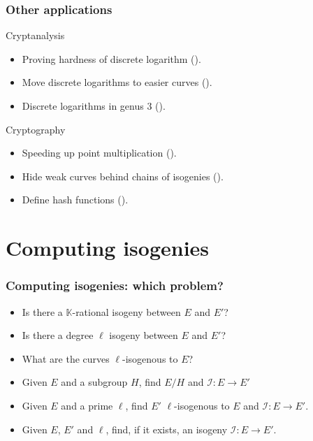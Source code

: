 \documentclass[10pt]{beamer}
\newcommand{\blue}[1]{\textcolor{blue}{#1}}  %
\newcommand{\K}{\mathbb{K}}  %
\newcommand{\0}{\mathcal{O}}  %
\newcommand{\isog}[1]{\mathcal{#1}}  %
\newcommand{\I}{\isog{I}}  %
\begin{document}
\begin{frame}
  \frametitle{Other applications}
  
  \begin{block}{Cryptanalysis}
    \begin{itemize}
    \item Proving hardness of discrete logarithm (\cite{JMV05}).
    \item Move discrete logarithms to easier curves (\cite{GHS}).
    \item Discrete logarithms in genus $3$ (\cite{Ben}).
    \end{itemize}
  \end{block}
  
  \begin{block}{Cryptography}
    \begin{itemize}
    \item Speeding up point multiplication (\cite{GLV}).
    \item Hide weak curves behind chains of isogenies (\cite{Tes06}).
    \item Define hash functions (\cite{CLG09}).
    \end{itemize}
  \end{block}
\end{frame}


\section{Computing isogenies}

\begin{frame}
  \frametitle{Computing isogenies: which problem?}
  
  \begin{itemize}
  \setlength{\itemsep}{1em}
  \item Is there a $\K$-rational isogeny between $E$ and $E'$?
    \hfill\only<2->{\blue{$\Leftrightarrow \#E(\K) = \#E'(\K)$}}
  \item Is there a degree $\ell$ isogeny between $E$ and $E'$?
    \hfill\only<2->{\blue{$\Leftrightarrow \Phi_\ell(j(E), j(E')) = 0$}}
  \item What are the curves $\ell$-isogenous to $E$?
    \hfill\only<2->{\blue{factor $\Phi_\ell(j(E), Y)$}}
  \item Given $E$ and a subgroup $H$, find $E/H$ and $\I:E\rightarrow
    E'$ \hfill\only<2->{\blue{Vélu formulae}}
  \item Given $E$ and a prime $\ell$, find $E'$ $\ell$-isogenous to
    $E$ and $\I:E\rightarrow E'$.\hfill\only<3->{\blue{(*)}}
  \item \alert<3>{Given $E$, $E'$ and $\ell$, find, if it exists, an isogeny
    $\I:E\rightarrow E'$.}
  \end{itemize}
\end{frame}
\end{document}
